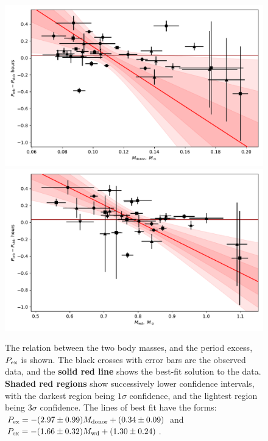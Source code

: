 \begin{figure}
    \centering
    \includegraphics[width=\columnwidth]{figures/results/Mdot/Period_excess_Mr.pdf}
    \includegraphics[width=\columnwidth]{figures/results/Mdot/Period_excess_Mwd.pdf}
    \caption{The relation between the two body masses, and the period excess, $P_{\rm ex}$ is shown. The {\rm black crosses with error bars} are the observed data, and the {\bf solid red line} shows the best-fit solution to the data. {\bf Shaded red regions} show successively lower confidence intervals, with the darkest region being $1\sigma$ confidence, and the lightest region being $3\sigma$ confidence. The lines of best fit have the forms: $P_{\rm ex} = -(2.97\pm0.99) M_{\rm donor} + (0.34\pm0.09)$ and $P_{\rm ex} = -(1.66\pm0.32) M_{\rm wd} + (1.30\pm0.24)$.}
    \label{fig:period excess}
\end{figure}



